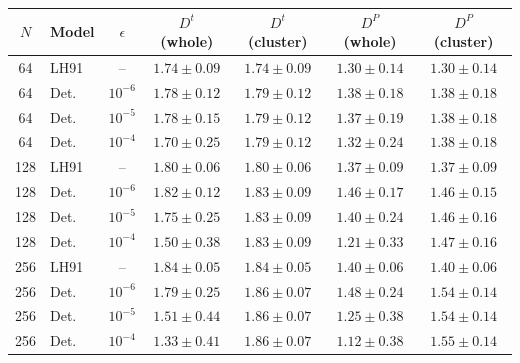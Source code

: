 \begin{tabular}{|c|l|c|c|c|c|c|}
\hline
\rowcolor[HTML]{C0C0C0}
$N$ & Model & $\epsilon$ & $D^{t}$ (whole) & $D^{t}$ (cluster) & $D^{P}$ (whole) & $D^{P}$ (cluster) \\ \hline
64 & LH91 & -- & $1.74\pm0.09$ & $1.74\pm0.09$ & $1.30\pm0.14$ & $1.30\pm0.14$ \\
64 & Det. & $10^{-6}$ & $1.78\pm0.12$ & $1.79\pm0.12$ & $1.38\pm0.18$ & $1.38\pm0.18$ \\
64 & Det. & $10^{-5}$ & $1.78\pm0.15$ & $1.79\pm0.12$ & $1.37\pm0.19$ & $1.38\pm0.18$ \\
64 & Det. & $10^{-4}$ & $1.70\pm0.25$ & $1.79\pm0.12$ & $1.32\pm0.24$ & $1.38\pm0.18$ \\
\hline
128 & LH91 & -- & $1.80\pm0.06$ & $1.80\pm0.06$ & $1.37\pm0.09$ & $1.37\pm0.09$ \\
128 & Det. & $10^{-6}$ & $1.82\pm0.12$ & $1.83\pm0.09$ & $1.46\pm0.17$ & $1.46\pm0.15$ \\
128 & Det. & $10^{-5}$ & $1.75\pm0.25$ & $1.83\pm0.09$ & $1.40\pm0.24$ & $1.46\pm0.16$ \\
128 & Det. & $10^{-4}$ & $1.50\pm0.38$ & $1.83\pm0.09$ & $1.21\pm0.33$ & $1.47\pm0.16$ \\
\hline
256 & LH91 & -- & $1.84\pm0.05$ & $1.84\pm0.05$ & $1.40\pm0.06$ & $1.40\pm0.06$ \\
256 & Det. & $10^{-6}$ & $1.79\pm0.25$ & $1.86\pm0.07$ & $1.48\pm0.24$ & $1.54\pm0.14$ \\
256 & Det. & $10^{-5}$ & $1.51\pm0.44$ & $1.86\pm0.07$ & $1.25\pm0.38$ & $1.54\pm0.14$ \\
256 & Det. & $10^{-4}$ & $1.33\pm0.41$ & $1.86\pm0.07$ & $1.12\pm0.38$ & $1.55\pm0.14$ \\
\hline
\end{tabular}
